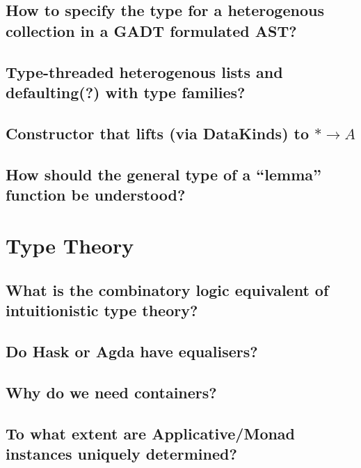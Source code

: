 \documentclass{book}%
\begin{document}
\section{How to specify the type for a heterogenous collection in a GADT formulated AST?}


\section{Type-threaded heterogenous lists and defaulting(?) with type families?}


\section{Constructor that lifts (via DataKinds) to $\ast\to A$}


\section{How should the general type of a ``lemma'' function be understood?}



\chapter{Type Theory}

\section{What is the combinatory logic equivalent of intuitionistic type theory?}


\section{Do Hask or Agda have equalisers?}


\section{Why do we need containers?}


\section{To what extent are Applicative/Monad instances uniquely determined?}

\end{document}
